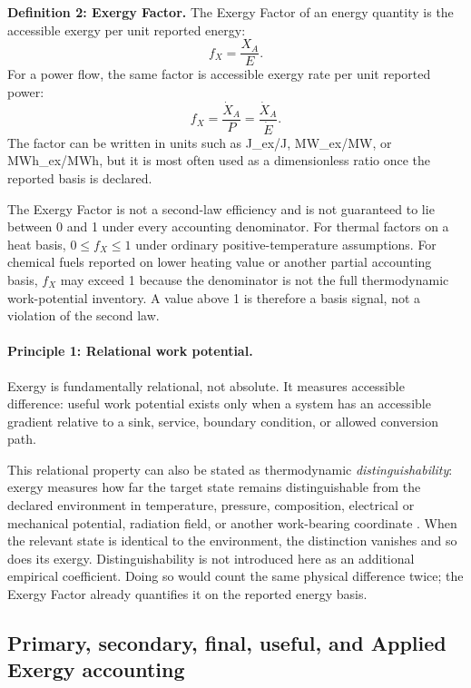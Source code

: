 \documentclass[11pt]{article}
\newcommand{\fx}{f_X}
\newcommand{\XA}{X_A}
\newcommand{\XdotA}{\dot{X}_A}
\begin{document}
\textbf{Definition 2: Exergy Factor.} The Exergy Factor of an energy quantity is the accessible exergy per unit reported energy:
\begin{equation}
\fx = \frac{\XA}{E}.
\end{equation}
For a power flow, the same factor is accessible exergy rate per unit reported power:
\begin{equation}
\fx = \frac{\XdotA}{P}=\frac{\XdotA}{\dot{E}}.
\end{equation}
The factor can be written in units such as J\_ex/J, MW\_ex/MW, or MWh\_ex/MWh, but it is most often used as a dimensionless ratio once the reported basis is declared.

The Exergy Factor is not a second-law efficiency and is not guaranteed to lie between 0 and 1 under every accounting denominator. For thermal factors on a heat basis, $0\le \fx\le 1$ under ordinary positive-temperature assumptions. For chemical fuels reported on lower heating value or another partial accounting basis, $\fx$ may exceed 1 because the denominator is not the full thermodynamic work-potential inventory. A value above 1 is therefore a basis signal, not a violation of the second law.

\paragraph{Principle 1: Relational work potential.} Exergy is fundamentally relational, not absolute. It measures accessible difference: useful work potential exists only when a system has an accessible gradient relative to a sink, service, boundary condition, or allowed conversion path.

This relational property can also be stated as thermodynamic \emph{distinguishability}: exergy measures how far the target state remains distinguishable from the declared environment in temperature, pressure, composition, electrical or mechanical potential, radiation field, or another work-bearing coordinate \cite{ayres2006}. When the relevant state is identical to the environment, the distinction vanishes and so does its exergy. Distinguishability is not introduced here as an additional empirical coefficient. Doing so would count the same physical difference twice; the Exergy Factor already quantifies it on the reported energy basis.

\subsection{Primary, secondary, final, useful, and Applied Exergy accounting}
\end{document}
